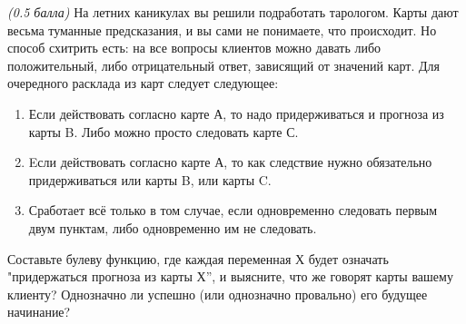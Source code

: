 \question
\textit{(0.5 балла)} На летних каникулах вы решили подработать тарологом. Карты дают весьма туманные предсказания, и вы сами не понимаете, что происходит. Но способ схитрить есть: на все вопросы клиентов можно давать либо положительный, либо отрицательный ответ, зависящий от значений карт. Для очередного расклада из карт следует следующее:

\begin{enumerate}
\item Если действовать согласно карте А, то надо придерживаться и прогноза из карты B. Либо можно просто следовать карте С.
\item Eсли действовать согласно карте А, то как следствие нужно обязательно придерживаться или карты B, или карты C.
\item Сработает всё только в том случае, если одновременно следовать первым двум пунктам, либо одновременно им не следовать.
\end{enumerate}

Составьте булеву функцию, где каждая переменная Х будет означать "придержаться прогноза из карты Х”, и выясните, что же говорят карты вашему клиенту? Однозначно ли успешно (или однозначно провально) его будущее начинание?